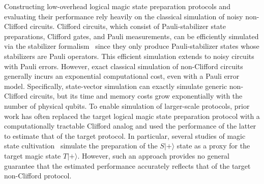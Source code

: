 \documentclass[
 reprint,
 amsmath,amssymb,
 pra,superscriptaddress, nofootinbib
]{revtex4-2}
\theoremstyle{definition}
\theoremstyle{plain}
\begin{document}
Constructing low-overhead logical magic state preparation protocols and evaluating their performance rely heavily on the classical simulation of noisy non-Clifford circuits.
Clifford circuits, which consist of Pauli-stabilizer state preparations, Clifford gates, and Pauli measurements, can be efficiently simulated via the stabilizer formalism~\cite{gottesman1998heisenbergrepresentationquantumcomputers,PhysRevA.70.052328} since they only produce Pauli-stabilizer states whose stabilizers are Pauli operators. This efficient simulation extends to noisy circuits with Pauli errors.
However, exact classical simulation of non-Clifford circuits generally incurs an exponential computational cost, even with a Pauli error model.
Specifically, state-vector simulation can exactly simulate generic non-Clifford circuits, but its time and memory costs grow exponentially with the number of physical qubits.
To enable simulation of larger-scale protocols, prior work has often replaced the target logical magic state preparation protocol with a computationally tractable Clifford analog and used the performance of the latter to estimate that of the target protocol.
In particular, several studies of magic state cultivation~\cite{gidney2024magicstatecultivationgrowing,thxx-njr6,9kys-3whh,gpvl-lg4c,p8tw-6kq9,claes2025cultivatingtstatessurface,ch5r-cnfq,hirano2026efficientmagicstatecultivation,hetenyi2026constantdepthmagicstate} simulate the preparation of the $S|+\rangle$ state as a proxy for the target magic state $T|+\rangle$. However, such an approach provides no general guarantee that the estimated performance accurately reflects that of the target non-Clifford protocol.
\end{document}
